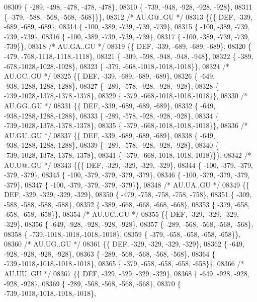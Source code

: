 \begin{DoxyCode}
08309 \{ -289, -498, -478, -478, -478\},
08310 \{ -739, -948, -928, -928, -928\},
08311 \{ -379, -588, -568, -568, -568\}\}\},
08312 \textcolor{comment}{/* AU.G@..GU */}
08313 \{\{\{  DEF, -339, -689, -689, -689\},
08314 \{ -100, -389, -739, -739, -739\},
08315 \{ -100, -389, -739, -739, -739\},
08316 \{ -100, -389, -739, -739, -739\},
08317 \{ -100, -389, -739, -739, -739\}\},
08318 \textcolor{comment}{/* AU.GA..GU */}
08319 \{\{  DEF, -339, -689, -689, -689\},
08320 \{ -479, -768,-1118,-1118,-1118\},
08321 \{ -309, -598, -948, -948, -948\},
08322 \{ -389, -678,-1028,-1028,-1028\},
08323 \{ -379, -668,-1018,-1018,-1018\}\},
08324 \textcolor{comment}{/* AU.GC..GU */}
08325 \{\{  DEF, -339, -689, -689, -689\},
08326 \{ -649, -938,-1288,-1288,-1288\},
08327 \{ -289, -578, -928, -928, -928\},
08328 \{ -739,-1028,-1378,-1378,-1378\},
08329 \{ -379, -668,-1018,-1018,-1018\}\},
08330 \textcolor{comment}{/* AU.GG..GU */}
08331 \{\{  DEF, -339, -689, -689, -689\},
08332 \{ -649, -938,-1288,-1288,-1288\},
08333 \{ -289, -578, -928, -928, -928\},
08334 \{ -739,-1028,-1378,-1378,-1378\},
08335 \{ -379, -668,-1018,-1018,-1018\}\},
08336 \textcolor{comment}{/* AU.GU..GU */}
08337 \{\{  DEF, -339, -689, -689, -689\},
08338 \{ -649, -938,-1288,-1288,-1288\},
08339 \{ -289, -578, -928, -928, -928\},
08340 \{ -739,-1028,-1378,-1378,-1378\},
08341 \{ -379, -668,-1018,-1018,-1018\}\}\},
08342 \textcolor{comment}{/* AU.U@..GU */}
08343 \{\{\{  DEF, -329, -329, -329, -329\},
08344 \{ -100, -379, -379, -379, -379\},
08345 \{ -100, -379, -379, -379, -379\},
08346 \{ -100, -379, -379, -379, -379\},
08347 \{ -100, -379, -379, -379, -379\}\},
08348 \textcolor{comment}{/* AU.UA..GU */}
08349 \{\{  DEF, -329, -329, -329, -329\},
08350 \{ -479, -758, -758, -758, -758\},
08351 \{ -309, -588, -588, -588, -588\},
08352 \{ -389, -668, -668, -668, -668\},
08353 \{ -379, -658, -658, -658, -658\}\},
08354 \textcolor{comment}{/* AU.UC..GU */}
08355 \{\{  DEF, -329, -329, -329, -329\},
08356 \{ -649, -928, -928, -928, -928\},
08357 \{ -289, -568, -568, -568, -568\},
08358 \{ -739,-1018,-1018,-1018,-1018\},
08359 \{ -379, -658, -658, -658, -658\}\},
08360 \textcolor{comment}{/* AU.UG..GU */}
08361 \{\{  DEF, -329, -329, -329, -329\},
08362 \{ -649, -928, -928, -928, -928\},
08363 \{ -289, -568, -568, -568, -568\},
08364 \{ -739,-1018,-1018,-1018,-1018\},
08365 \{ -379, -658, -658, -658, -658\}\},
08366 \textcolor{comment}{/* AU.UU..GU */}
08367 \{\{  DEF, -329, -329, -329, -329\},
08368 \{ -649, -928, -928, -928, -928\},
08369 \{ -289, -568, -568, -568, -568\},
08370 \{ -739,-1018,-1018,-1018,-1018\},

\end{DoxyCode}
